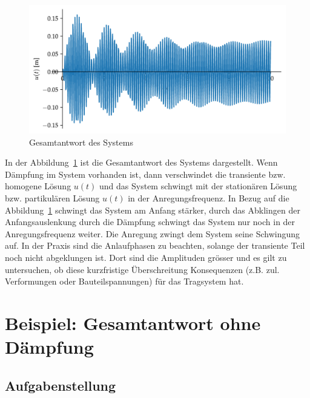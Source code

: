\documentclass[
  letterpaper,
  DIV=11]{scrreprt}
\begin{document}
\begin{figure}[H]

{\centering \includegraphics{index_files/mediabag/ems_03_files/figure-pdf/fig-ems_dyn_verg_gesamtantwort-output-1.pdf}

}

\caption{\label{fig-ems_dyn_verg_gesamtantwort}Gesamtantwort des
Systems}

\end{figure}

In der Abbildung~\ref{fig-ems_dyn_verg_gesamtantwort} ist die
Gesamtantwort des Systems dargestellt. Wenn Dämpfung im System vorhanden
ist, dann verschwindet die transiente bzw. homogene Lösung \(u(t)\) und
das System schwingt mit der stationären Lösung bzw. partikulären Lösung
\(u(t)\) in der Anregungsfrequenz. In Bezug auf die
Abbildung~\ref{fig-ems_dyn_verg_gesamtantwort} schwingt das System am
Anfang stärker, durch das Abklingen der Anfangsauslenkung durch die
Dämpfung schwingt das System nur noch in der Anregungsfrequenz weiter.
Die Anregung zwingt dem System seine Schwingung auf. In der Praxis sind
die Anlaufphasen zu beachten, solange der transiente Teil noch nicht
abgeklungen ist. Dort sind die Amplituden grösser und es gilt zu
untersuchen, ob diese kurzfristige Überschreitung Konsequenzen (z.B.
zul. Verformungen oder Bauteilspannungen) für das Tragsystem hat.

\hypertarget{beispiel-gesamtantwort-ohne-duxe4mpfung}{%
\chapter{Beispiel: Gesamtantwort ohne
Dämpfung}\label{beispiel-gesamtantwort-ohne-duxe4mpfung}}

\hypertarget{aufgabenstellung-6}{%
\section{Aufgabenstellung}\label{aufgabenstellung-6}}
\end{document}

